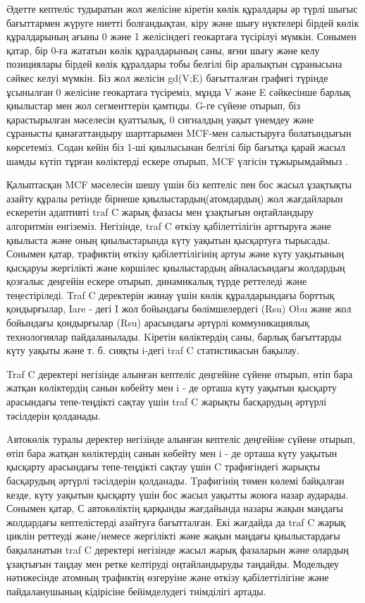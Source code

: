 Әдетте кептеліс тудыратын жол желісіне кіретін көлік құралдары әр түрлі
шығыс бағыттармен жүруге ниетті болғандықтан, кіру және шығу нүктелері
бірдей көлік құралдарының ағыны 0 және 1 желісіндегі геокартаға
түсірілуі мүмкін. Сонымен қатар, бір 0-ға жататын көлік құралдарының
саны, яғни шығу және келу позициялары бірдей көлік құралдары тобы
белгілі бір аралықтын сұранысына сәйкес келуі мүмкін. Біз жол желісін
gd(V;E) бағытталған графигі түрінде ұсынылған 0 желісіне геокартаға
түсіреміз, мұнда V және E сәйкесінше барлық қиылыстар мен жол
сегменттерін қамтиды. G-ге сүйене отырып, біз қарастырылған мәселесін
қуаттылық, 0 сигналдың уақыт үнемдеу және сұранысты қанағаттандыру
шарттарымен MCF-мен салыстыруға болатындығын көрсетеміз. Содан кейін біз
1-ші қиылысынан белгілі бір бағытқа қарай жасыл шамды күтіп тұрған
көліктерді ескере отырып, MCF үлгісін тұжырымдаймыз .

Қалыптасқан MCF мәселесін шешу үшін біз кептеліс пен бос жасыл ұзақтықты
азайту құралы ретінде бірнеше қиылыстардың(атомдардың) жол жағдайларын
ескеретін адаптивті traf C жарық фазасы мен ұзақтығын оңтайландыру
алгоритмін енгіземіз. Негізінде, traf C өткізу қабілеттілігін арттыруға
және қиылыста және оның қиылыстарында күту уақытын қысқартуға тырысады.
Сонымен қатар, трафиктің өткізу қабілеттілігінің артуы және күту
уақытының қысқаруы жергілікті және көршілес қиылыстардың айналасындағы
жолдардың қозғалыс деңгейін ескере отырып, динамикалық түрде реттеледі
және теңестіріледі. Traf C деректерін жинау үшін көлік құралдарындағы
борттық қондырғылар, Iare - дегі I жол бойындағы бөлімшелердегі (Rsu)
Obu және жол бойындағы қондырғылар (Rsu) арасындағы әртүрлі
коммуникациялық технологиялар пайдаланылады. Kіретін көліктердің саны,
барлық бағыттарды күту уақыты және т. б. сияқты i-дегі traf C
статистикасын бақылау.

Traf C деректері негізінде алынған кептеліс деңгейіне сүйене отырып,
өтіп бара жатқан көліктердің санын көбейту мен i - де орташа күту
уақытын қысқарту арасындағы тепе-теңдікті сақтау үшін traf C жарықты
басқарудың әртүрлі тәсілдерін қолданады.

Aвтокөлік туралы деректер негізінде алынған кептеліс деңгейіне сүйене
отырып, өтіп бара жатқан көліктердің санын көбейту мен i - де орташа
күту уақытын қысқарту арасындағы тепе-теңдікті сақтау үшін C
трафигіндегі жарықты басқарудың әртүрлі тәсілдерін қолданады. Tрафигінің
төмен көлемі байқалған кезде, күту уақытын қысқарту үшін бос жасыл
уақытты жоюға назар аударады. Сонымен қатар, С автокөліктің қарқынды
жағдайында назары жақын маңдағы жолдардағы кептелістерді азайтуға
бағытталған. Екі жағдайда да traf C жарық циклін реттеуді және/немесе
жергілікті және жақын маңдағы қиылыстардағы бақыланатын traf C деректері
негізінде жасыл жарық фазаларын және олардың ұзақтығын таңдау мен ретке
келтіруді оңтайландыруды таңдайды. Модельдеу нәтижесінде атомның
трафиктің өзгеруіне және өткізу қабілеттілігіне және пайдаланушының
кідірісіне бейімделудегі тиімділігі артады.


